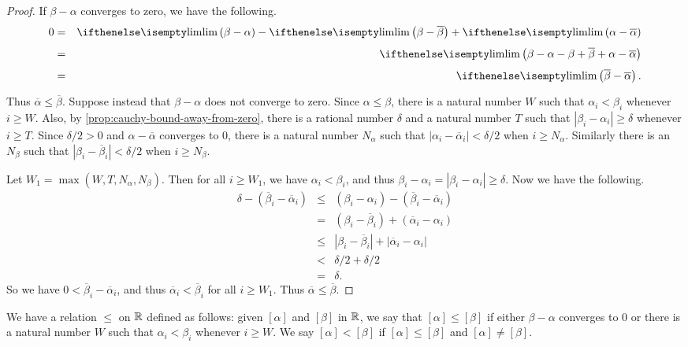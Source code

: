 \begin{proof}
If \(\beta - \alpha\) converges to zero, we have the following.
\begin{eqnarray*}
0 & = & \LIM{\beta - \alpha} - \LIM{\beta - \overline{\beta}} + \LIM{\alpha - \overline{\alpha}} \\
 & = & \LIM{\beta - \alpha - \beta + \overline{\beta} + \alpha - \overline{\alpha}} \\
 & = & \LIM{\overline{\beta} - \overline{\alpha}}.
\end{eqnarray*}
Thus \(\overline{\alpha} \leq \overline{\beta}\).
Suppose instead that \(\beta - \alpha\) does not converge to zero.
Since \(\alpha \leq \beta\), there is a natural number \(W\) such that \(\alpha_i < \beta_i\) whenever \(i \geq W\).
Also, by \ref{prop:cauchy-bound-away-from-zero}, there is a rational number \(\delta\) and a natural number \(T\) such that \(|\beta_i - \alpha_i| \geq \delta\) whenever \(i \geq T\).
Since \(\delta/2 > 0\) and \(\alpha - \overline{\alpha}\) converges to 0, there is a natural number \(N_\alpha\) such that \(|\alpha_i - \overline{\alpha}_i| < \delta/2\) when \(i \geq N_\alpha\).
Similarly there is an \(N_\beta\) such that \(|\beta_i - \overline{\beta}_i| < \delta/2\) when \(i \geq N_\beta\).

Let \(W_1 = \max(W, T, N_\alpha, N_\beta)\).
Then for all \(i \geq W_1\), we have \(\alpha_i < \beta_i\), and thus \(\beta_i - \alpha_i = |\beta_i - \alpha_i| \geq \delta\).
Now we have the following.
\begin{eqnarray*}
\delta - (\overline{\beta}_i - \overline{\alpha}_i)
 & \leq & (\beta_i - \alpha_i) - (\overline{\beta}_i - \overline{\alpha}_i) \\
 & = & (\beta_i - \overline{\beta}_i) + (\overline{\alpha}_i - \alpha_i) \\
 & \leq & |\beta_i - \overline{\beta}_i| + |\overline{\alpha}_i - \alpha_i| \\
 & < & \delta/2 + \delta/2 \\
 & = & \delta.
\end{eqnarray*}
So we have \(0 < \overline{\beta}_i - \overline{\alpha}_i\), and thus \(\overline{\alpha}_i < \overline{\beta}_i\) for all \(i \geq W_1\).
Thus \(\overline{\alpha} \leq \overline{\beta}\).
\end{proof}

\begin{cor}
We have a relation \(\leq\) on \(\mathbb{R}\) defined as follows: given \([\alpha]\) and \([\beta]\) in \(\mathbb{R}\), we say that \([\alpha] \leq [\beta]\) if either \(\beta - \alpha\) converges to 0 or there is a natural number \(W\) such that \(\alpha_i < \beta_i\) whenever \(i \geq W\).
We say \([\alpha] < [\beta]\) if \([\alpha] \leq [\beta]\) and \([\alpha] \neq [\beta]\).
\end{cor}

